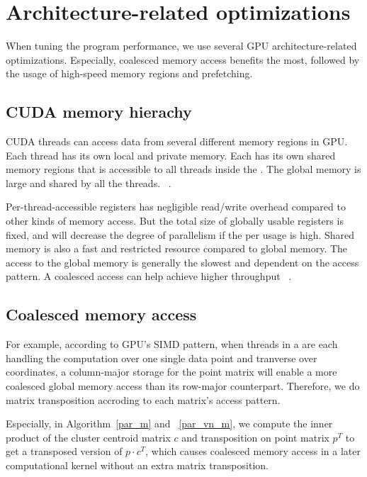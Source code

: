 \section{Architecture-related optimizations}
\label{s:optimization}

When tuning the program performance, we use several
GPU architecture-related optimizations. Especially, coalesced memory access 
benefits the most, followed by the usage of high-speed memory regions and
prefetching.

\subsection{CUDA memory hierachy}

CUDA threads can access data from several different memory regions in GPU. Each 
thread has its own local and private memory. Each \TB has its own shared
memory regions that is accessible to all threads inside the \TB. The
global memory is large and shared by all the threads. ~\cite{cuda-program-guide}.

Per-thread-accessible registers has negligible read/write overhead compared to 
other kinds of memory access. But the total size of globally usable registers is 
fixed, and will decrease the degree of parallelism if the per \TB usage is high.
Shared memory is also a fast and restricted resource compared to global memory.
The access to the global memory is generally the slowest and dependent on the 
access pattern. A coalesced access can help achieve higher throughput
~\cite{kepler-tuning}. 

\subsection{Coalesced memory access}

For example, according to GPU's SIMD pattern, when threads in a \TB are each 
handling the computation over one single data point and tranverse over coordinates,
a column-major storage for the point matrix will enable a more coalesced global
memory access than its row-major counterpart. Therefore, we do matrix transposition
accroding to each matrix's access pattern.

Especially, in Algorithm~\ref{par_m} and ~\ref{par_vn_m}, we compute the inner 
product of the cluster centroid matrix $c$ and transposition on point matrix
$p^T$ to get a transposed version of $p \cdot c^T$, which causes coalesced memory
access in a later computational kernel without an extra matrix transposition.


